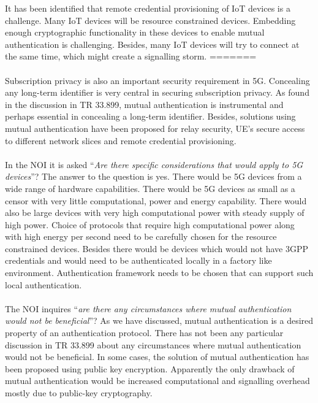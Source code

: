 \documentclass[12pt]{llncs}
\newcommand\ques[1]{``\emph{#1}''}
\begin{document}
It has been identified that remote credential provisioning of IoT devices is a challenge. Many IoT devices will be resource constrained devices. Embedding enough cryptographic functionality in these devices to enable mutual authentication is challenging. Besides, many IoT devices will try to connect at the same time, which might create a signalling storm.
=======
\paragraph{}
Subscription privacy is also an important security requirement in 5G. Concealing any long-term  identifier is very central in securing subscription privacy. As found in the discussion in TR 33.899, mutual authentication is instrumental and perhaps essential in concealing a long-term identifier. Besides, solutions using mutual authentication have been proposed for relay security, UE's secure access to different network slices and remote credential provisioning.
\paragraph{}
In the NOI it is asked \ques{Are there specific considerations that would apply to 5G devices}? The answer to the question is yes. There would be 5G devices from a wide range of hardware capabilities. There would be 5G devices as small as a censor with very little computational, power and energy capability. There would also be large devices with very high computational power with steady supply of high power. Choice of protocols that require high computational power along with high energy per second need to be carefully chosen for the resource constrained devices. Besides there would be devices which would not have 3GPP credentials and would need to be authenticated locally in a factory like environment. Authentication framework needs to be chosen that can support such local authentication.
\paragraph{} The NOI inquires \ques{are there any circumstances where mutual authentication would not be beneficial}? As we have discussed, mutual authentication is a desired property of an authentication protocol. There has not been any particular discussion in TR 33.899 about any circumstances where mutual authentication would not be beneficial. In some cases, the solution of mutual authentication has been proposed using public key encryption. Apparently the only drawback of mutual authentication would be increased computational and signalling overhead mostly due to public-key cryptography.
\end{document}
